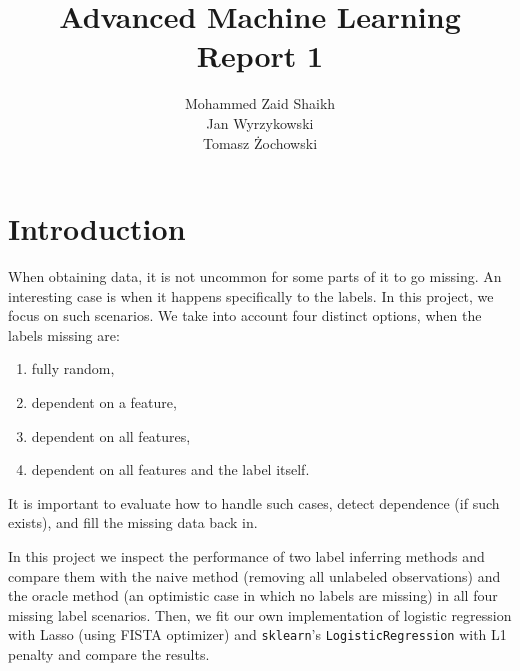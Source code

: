 \documentclass{article}
\title{Advanced Machine Learning\\Report 1}
\author{Mohammed Zaid Shaikh\\Jan Wyrzykowski\\Tomasz Żochowski}
\begin{document}
\maketitle
\tableofcontents
\newpage

\section{Introduction}




When obtaining data, it is not uncommon for some parts of it to go missing. An interesting case is when it happens specifically to the labels. In this project, we focus on such scenarios. We take into account four distinct options, when the labels missing are:

\begin{enumerate}
    \item fully random,
    \item dependent on a feature,
    \item dependent on all features,
    \item dependent on all features and the label itself.
\end{enumerate}

It is important to evaluate how to handle such cases, detect dependence (if such exists), and fill the missing data back in. 

In this project we inspect the performance of two label inferring methods and compare them with the naive method (removing all unlabeled observations) and the oracle method (an optimistic case in which no labels are missing) in all four missing label scenarios. Then, we fit our own implementation of logistic regression with Lasso (using FISTA optimizer) and \verb|sklearn|'s \verb|LogisticRegression| with L1 penalty and compare the results.
\end{document}
